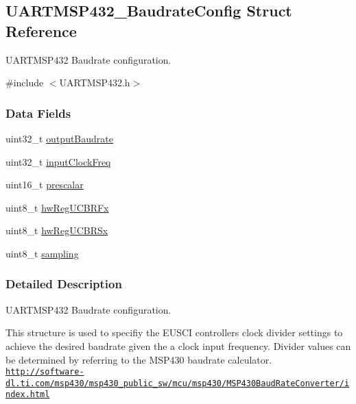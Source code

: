 \subsection{U\+A\+R\+T\+M\+S\+P432\+\_\+\+Baudrate\+Config Struct Reference}
\label{struct_u_a_r_t_m_s_p432___baudrate_config}


U\+A\+R\+T\+M\+S\+P432 Baudrate configuration.  




{\ttfamily \#include $<$U\+A\+R\+T\+M\+S\+P432.\+h$>$}

\subsubsection*{Data Fields}
\begin{DoxyCompactItemize}
\item 
uint32\+\_\+t \hyperlink{struct_u_a_r_t_m_s_p432___baudrate_config_a903e0a3558989cce5cb81d244669f293}{output\+Baudrate}
\item 
uint32\+\_\+t \hyperlink{struct_u_a_r_t_m_s_p432___baudrate_config_ae8dc8424fd4457d5b9234678d0edaa10}{input\+Clock\+Freq}
\item 
uint16\+\_\+t \hyperlink{struct_u_a_r_t_m_s_p432___baudrate_config_a2a49b530580e8d6a2826dc9eab79d699}{prescalar}
\item 
uint8\+\_\+t \hyperlink{struct_u_a_r_t_m_s_p432___baudrate_config_ab0bd32e5fbee49e6f205aefed9b16407}{hw\+Reg\+U\+C\+B\+R\+Fx}
\item 
uint8\+\_\+t \hyperlink{struct_u_a_r_t_m_s_p432___baudrate_config_a32214f6731b6cbaa74b3498e7e3f0732}{hw\+Reg\+U\+C\+B\+R\+Sx}
\item 
uint8\+\_\+t \hyperlink{struct_u_a_r_t_m_s_p432___baudrate_config_a8c636ac0031b571cf9821758ce85a3de}{sampling}
\end{DoxyCompactItemize}


\subsubsection{Detailed Description}
U\+A\+R\+T\+M\+S\+P432 Baudrate configuration. 

This structure is used to specifiy the E\+U\+S\+C\+I controller\textquotesingle{}s clock divider settings to achieve the desired baudrate given the a clock input frequency. Divider values can be determined by referring to the M\+S\+P430 baudrate calculator. \href{http://software-dl.ti.com/msp430/msp430_public_sw/mcu/msp430/MSP430BaudRateConverter/index.html}{\tt http\+://software-\/dl.\+ti.\+com/msp430/msp430\+\_\+public\+\_\+sw/mcu/msp430/\+M\+S\+P430\+Baud\+Rate\+Converter/index.\+html}

